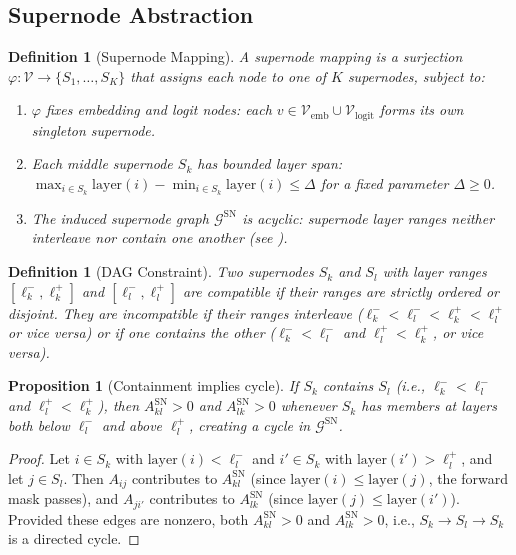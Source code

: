 \documentclass[11pt]{article}
\newtheorem{proposition}[theorem]{Proposition}
\newtheorem{definition}[theorem]{Definition}
\newcommand{\cG}{\mathcal{G}}
\newcommand{\cV}{\mathcal{V}}
\newcommand{\1}{\mathbbm{1}}
\begin{document}
\subsection{Supernode Abstraction}
\label{sec:sn-def}

\begin{definition}[Supernode Mapping]
  A \emph{supernode mapping} is a surjection $\varphi: \cV \to \{S_1, \ldots, S_K\}$ that assigns each node to one of $K$ supernodes, subject to:
  \begin{enumerate}[label=(\roman*)]
    \item $\varphi$ fixes embedding and logit nodes: each $v \in \cV_{\mathrm{emb}} \cup \cV_{\mathrm{logit}}$ forms its own singleton supernode.
    \item Each middle supernode $S_k$ has bounded layer span: $\max_{i \in S_k} \mathrm{layer}(i) - \min_{i \in S_k} \mathrm{layer}(i) \le \Delta$ for a fixed parameter $\Delta \ge 0$.
    \item The induced supernode graph $\cG^{\mathrm{SN}}$ is acyclic: supernode layer ranges neither interleave nor contain one another (see ).
  \end{enumerate}
\end{definition}

\begin{definition}[DAG Constraint]
\label{def:dag-constraint}
  Two supernodes $S_k$ and $S_l$ with layer ranges $[\ell^-_k, \ell^+_k]$ and $[\ell^-_l, \ell^+_l]$ are \emph{compatible} if their ranges are strictly ordered or disjoint.
  They are \emph{incompatible} if their ranges \emph{interleave} ($\ell^-_k < \ell^-_l < \ell^+_k < \ell^+_l$ or vice versa) or if one \emph{contains} the other ($\ell^-_k < \ell^-_l$ and $\ell^+_l < \ell^+_k$, or vice versa).
\end{definition}

\begin{proposition}[Containment implies cycle]
\label{prop:containment-cycle}
  If $S_k$ contains $S_l$ (i.e., $\ell^-_k < \ell^-_l$ and $\ell^+_l < \ell^+_k$), then $A^{\mathrm{SN}}_{kl} > 0$ and $A^{\mathrm{SN}}_{lk} > 0$ whenever $S_k$ has members at layers both below $\ell^-_l$ and above $\ell^+_l$, creating a cycle in $\cG^{\mathrm{SN}}$.
\end{proposition}

\begin{proof}
  Let $i \in S_k$ with $\mathrm{layer}(i) < \ell^-_l$ and $i' \in S_k$ with $\mathrm{layer}(i') > \ell^+_l$, and let $j \in S_l$.
  Then $A_{ij}$ contributes to $A^{\mathrm{SN}}_{kl}$ (since $\mathrm{layer}(i) \le \mathrm{layer}(j)$, the forward mask passes), and $A_{ji'}$ contributes to $A^{\mathrm{SN}}_{lk}$ (since $\mathrm{layer}(j) \le \mathrm{layer}(i')$).
  Provided these edges are nonzero, both $A^{\mathrm{SN}}_{kl} > 0$ and $A^{\mathrm{SN}}_{lk} > 0$, i.e., $S_k \to S_l \to S_k$ is a directed cycle.
\end{proof}
\end{document}
